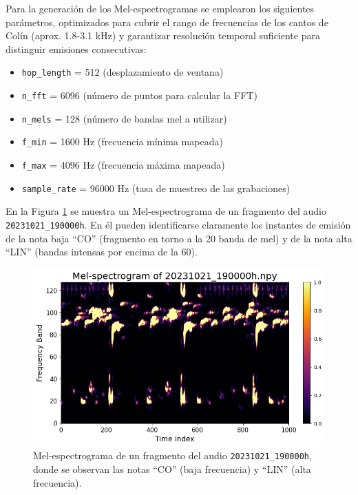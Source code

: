 Para la generación de los Mel-espectrogramas se emplearon los 
siguientes parámetros, optimizados para cubrir el rango de 
frecuencias de los cantos de Colín (aprox. 1.8-3.1 kHz) \cite{alonso2001llamadas} 
y garantizar resolución temporal suficiente para distinguir 
emisiones consecutivas:
\begin{itemize}
  \item \texttt{hop\_length} = 512 (desplazamiento de ventana)  
  \item \texttt{n\_fft} = 6096 (número de puntos para calcular la FFT)  
  \item \texttt{n\_mels} = 128 (número de bandas mel a utilizar)  
  \item \texttt{f\_min} = 1600 Hz (frecuencia mínima mapeada)  
  \item \texttt{f\_max} = 4096 Hz (frecuencia máxima mapeada)  
  \item \texttt{sample\_rate} = 96000 Hz (tasa de muestreo de las grabaciones)  
\end{itemize}

En la Figura \ref{fig:mel_example} se muestra un 
Mel-espectrograma de un fragmento del audio 
\texttt{20231021\_190000h}. En él pueden identificarse 
claramente los instantes de emisión de la nota baja “CO” 
(fragmento en torno a la 20 banda de mel) y de la nota alta “LIN” 
(bandas intensas por encima de la 60).

\begin{figure}[ht]
  \centering
  \includegraphics[width=0.9\linewidth]{Graphics/mel-spectrogram.png}
  \caption{Mel-espectrograma de un fragmento del audio \texttt{20231021\_190000h}, donde se observan las notas “CO” (baja frecuencia) y “LIN” (alta frecuencia).}
  \label{fig:mel_example}
\end{figure}







